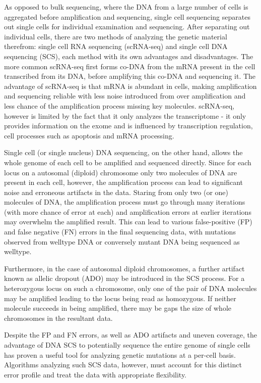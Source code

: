 \documentclass[../../main.tex]{subfiles}
\begin{document}
As opposed to bulk sequencing, where the DNA from a large number of cells is aggregated before amplification and sequencing, single cell sequencing separates out single cells for individual examination and sequencing.
After separating out individual cells, there are two methods of analyzing the genetic material therefrom: single cell RNA sequencing (scRNA-seq) and single cell DNA sequencing (SCS), each method with its own advantages and disadvantages.
The more common scRNA-seq first forms co-DNA from the mRNA present in the cell transcribed from its DNA, before amplifying this co-DNA and sequencing it.
The advantage of scRNA-seq is that mRNA is abundant in cells, making amplification and sequencing reliable with less noise introduced from over amplification and less chance of the amplification process missing key molecules.
scRNA-seq, however is limited by the fact that it only analyzes the transcriptome - it only provides information on the exome and is influenced by transcription regulation, cell processes such as apoptosis and mRNA processing.

Single cell (or single nucleus) DNA sequencing, on the other hand, allows the whole genome of each cell to be amplified and sequenced directly.
Since for each locus on a autosomal (diploid) chromosome only two molecules of DNA are present in each cell, however, the amplification process can lead to significant noise and erroneous artifacts in the data.
Staring from only two (or one) molecules of DNA, the amplification process must go through many iterations (with more chance of error at each) and amplification errors at earlier iterations may overwhelm the amplified result.
This can lead to various false-positive (FP) and false negative (FN) errors in the final sequencing data, with mutations observed from welltype DNA or conversely mutant DNA being sequenced as welltype.

Furthermore, in the case of autosomal diploid chromosomes, a further artifact known as allelic dropout (ADO) may be introduced in the SCS process.
For a heterozygous locus on such a chromosome, only one of the pair of DNA molecules may be amplified leading to the locus being read as homozygous.
If neither molecule succeeds in being amplified, there may be gaps the size of whole chromosomes in the resultant data.

Despite the FP and FN errors, as well as ADO artifacts and uneven coverage, the advantage of DNA SCS to potentially sequence the entire genome of single cells has proven a useful tool for analyzing genetic mutations at a per-cell basis.
Algorithms analyzing such SCS data, however, must account for this distinct error profile and treat the data with appropriate flexibility.
\end{document}
